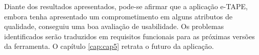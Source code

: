 \par 
Diante dos resultados apresentados, pode-se afirmar que a aplicação e-TAPE, embora tenha apresentado um comprometimento em alguns atributos de qualidade, 
conseguiu uma boa avaliação de usabilidade. Os problemas identificados serão traduzidos em requisitos funcionais para as próximas versões da ferramenta. 
O capítulo \ref{cap:cap5} retrata o futuro da aplicação.  
